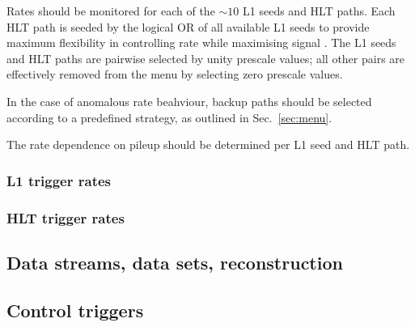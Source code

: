 Rates should be monitored for each of the ${\sim}10$ L1 seeds and HLT
paths. Each HLT path is seeded by the logical OR of all available L1
seeds to provide maximum flexibility in controlling rate while
maximising signal \axe. The L1 seeds and HLT paths are pairwise
selected by unity prescale values; all other pairs are effectively
removed from the menu by selecting zero prescale values.

In the case of anomalous rate beahviour, backup paths should be
selected according to a predefined strategy, as outlined in
Sec.~\ref{sec:menu}.

The rate dependence on pileup should be determined per L1 seed and HLT
path.

\subsubsection{L1 trigger rates} 

\subsubsection{HLT trigger rates} 

\subsection{Data streams, data sets, reconstruction}

\subsection{Control triggers}
